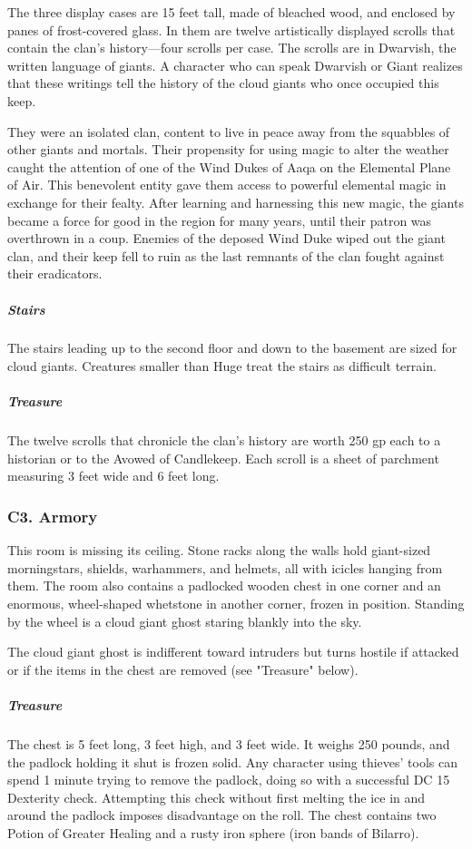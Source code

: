 \documentclass[10pt,a4paper,twoside,bg=print,twocolumn,openany,nodeprecatedcode]{dndbook}
\begin{document}
The three display cases are 15 feet tall, made of bleached wood, and enclosed by panes of frost-covered glass. In them are twelve artistically displayed scrolls that contain the clan's history—four scrolls per case. The scrolls are in Dwarvish, the written language of giants. A character who can speak Dwarvish or Giant realizes that these writings tell the history of the cloud giants who once occupied this keep.

They were an isolated clan, content to live in peace away from the squabbles of other giants and mortals. Their propensity for using magic to alter the weather caught the attention of one of the Wind Dukes of Aaqa on the Elemental Plane of Air. This benevolent entity gave them access to powerful elemental magic in exchange for their fealty. After learning and harnessing this new magic, the giants became a force for good in the region for many years, until their patron was overthrown in a coup. Enemies of the deposed Wind Duke wiped out the giant clan, and their keep fell to ruin as the last remnants of the clan fought against their eradicators.

\subparagraph{Stairs}
The stairs leading up to the second floor and down to the basement are sized for cloud giants. Creatures smaller than Huge treat the stairs as difficult terrain.

\subparagraph{Treasure}
The twelve scrolls that chronicle the clan's history are worth 250 gp each to a historian or to the Avowed of Candlekeep. Each scroll is a sheet of parchment measuring 3 feet wide and 6 feet long.

\subsubsection{C3. Armory}
\begin{DndReadAloud}{}
This room is missing its ceiling. Stone racks along the walls hold giant-sized morningstars, shields, warhammers, and helmets, all with icicles hanging from them. The room also contains a padlocked wooden chest in one corner and an enormous, wheel-shaped whetstone in another corner, frozen in position. Standing by the wheel is a cloud giant ghost staring blankly into the sky.

\end{DndReadAloud}

The cloud giant ghost is indifferent toward intruders but turns hostile if attacked or if the items in the chest are removed (see "Treasure" below).

\subparagraph{Treasure}
The chest is 5 feet long, 3 feet high, and 3 feet wide. It weighs 250 pounds, and the padlock holding it shut is frozen solid. Any character using thieves' tools can spend 1 minute trying to remove the padlock, doing so with a successful DC 15 Dexterity check. Attempting this check without first melting the ice in and around the padlock imposes disadvantage on the roll. The chest contains two Potion of Greater Healing and a rusty iron sphere (iron bands of Bilarro).
\end{document}
